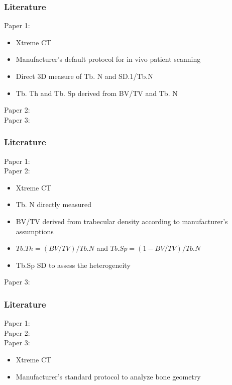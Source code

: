 \documentclass[xcolor=table]{beamer}
\begin{document}
\begin{frame}
	\frametitle{Literature}
	Paper 1: \cite{p4}
	\begin{itemize}
		\item Xtreme CT
		\item Manufacturer’s default protocol for in vivo patient scanning
		\item Direct 3D measure of Tb. N and SD.1/Tb.N
		\item Tb. Th and Tb. Sp derived from BV/TV and Tb. N
	\end{itemize}
	Paper 2: \cite{p5}\\
	Paper 3: \cite{p6}
\end{frame}

\begin{frame}[noframenumbering]
	\frametitle{Literature}
	Paper 1: \cite{p4}\\
	Paper 2: \cite{p5}
	\begin{itemize}
		\item Xtreme CT
		\item Tb. N directly measured
		\item BV/TV derived from trabecular density according
		to manufacturer's assumptions
		\item  $Tb.Th = (BV/TV)/Tb.N$ and $Tb.Sp = (1−BV/TV)/Tb.N$
		\item Tb.Sp SD to assess the heterogeneity
	\end{itemize}
	Paper 3: \cite{p6}
\end{frame}

\begin{frame}[noframenumbering]
	\frametitle{Literature}
	Paper 1: \cite{p4}\\
	Paper 2: \cite{p5}\\
	Paper 3: \cite{p6}
	\begin{itemize}
		\item Xtreme CT
		\item Manufacturer's standard protocol to analyze bone geometry
	\end{itemize}
\end{frame}
\end{document}
